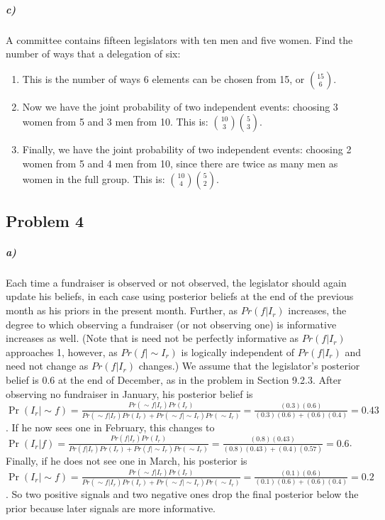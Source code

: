\documentclass[12pt,letter]{article}\usepackage[]{graphicx}\usepackage[]{color}
\begin{document}
\subparagraph{c)} A committee contains fifteen legislators with ten men and five women. Find the number of ways that a delegation of six:
\begin{enumerate}
	\item This is the number of ways 6 elements can be chosen from 15, or ${15}\choose{6}$. %
	\item Now we have the joint probability of two independent events: choosing 3 women from 5 and 3 men from 10. This is: ${{10}\choose{3}} {{5}\choose{3}}$. %
	\item Finally, we have the joint probability of two independent events: choosing 2 women from 5 and 4 men from 10, since there are twice as many men as women in the full group. This is: ${{10}\choose{4}} {{5}\choose{2}}$. %
\end{enumerate}



\subsection*{Problem 4}

\subparagraph{a)} Each time a fundraiser is observed or not observed, the legislator should again update his beliefs, in each case using posterior beliefs at the end of the previous month as his priors in the present month. Further, as $Pr(f|I_r)$ increases, the degree to which observing a fundraiser (or not observing one) is informative increases as well. (Note that is need not be perfectly informative as $Pr(f|I_r)$ approaches 1, however, as $Pr(f|\sim I_r)$ is logically independent of $Pr(f|I_r)$ and need not change as $Pr(f|I_r)$ changes.) We assume that the legislator's posterior belief is $0.6$ at the end of December, as in the problem in Section 9.2.3.  After observing no fundraiser in January, his posterior belief is $\Pr(I_r|\sim f)=\frac{Pr(\sim f|I_r)Pr(I_r)}{Pr(\sim f|I_r)Pr(I_r)+Pr(\sim f|\sim I_r)Pr(\sim I_r)}=\frac{(0.3)(0.6)}{(0.3)(0.6)+(0.6)(0.4)}=0.43$. If he now sees one in February, this changes to $\Pr(I_r|f)=\frac{Pr(f|I_r)Pr(I_r)}{Pr(f|I_r)Pr(I_r)+Pr(f|\sim I_r)Pr(\sim I_r)}=\frac{(0.8)(0.43)}{(0.8)(0.43)+(0.4)(0.57)}=0.6$. Finally, if he does not see one in March, his posterior is $\Pr(I_r|\sim f)=\frac{Pr(\sim f|I_r)Pr(I_r)}{Pr(\sim f|I_r)Pr(I_r)+Pr(\sim f|\sim I_r)Pr(\sim I_r)}=\frac{(0.1)(0.6)}{(0.1)(0.6)+(0.6)(0.4)}=0.2$. So two positive signals and two negative ones drop the final posterior below the prior because later signals are more informative.
\end{document}
